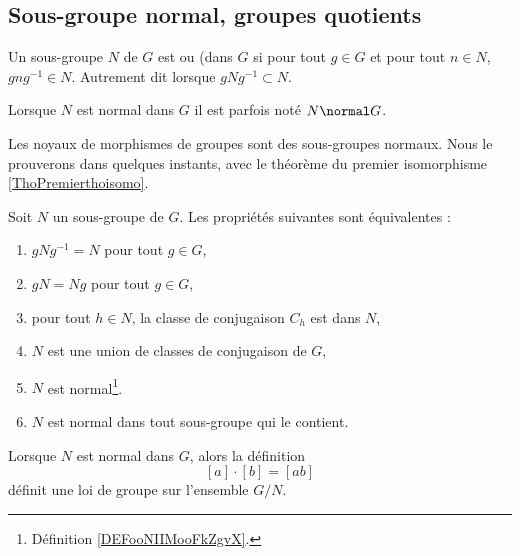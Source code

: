\subsection{Sous-groupe normal, groupes quotients}

\begin{definition}\label{DEFooNIIMooFkZgvX}
    Un sous-groupe \( N\) de \( G\) est  ou  (dans \( G \) si pour tout \( g\in G\) et pour tout \( n\in N\), \( gng^{-1}\in N\). Autrement dit lorsque \( gNg^{-1}\subset N\).

    Lorsque \( N\) est normal dans \( G\) il est parfois noté \( N\normal G\).
\end{definition}

\begin{example}
  Les noyaux de morphismes de groupes sont des sous-groupes normaux. Nous le prouverons dans quelques instants, avec le théorème du premier isomorphisme \ref{ThoPremierthoisomo}.
\end{example}

\begin{proposition}\label{propGroupeNormal}
    Soit \( N\) un sous-groupe de \( G\). Les propriétés suivantes sont équivalentes :
    \begin{enumerate}
        \item
            \( gNg^{-1}= N\) pour tout \( g\in G\),
        \item
            \( gN=Ng\) pour tout \( g\in G\),
        \item
            pour tout \( h \in N \), la classe de conjugaison \( C_h \) est dans \( N \),
        \item
            \( N\) est une union de classes de conjugaison de \( G\),
        \item
            \( N\) est normal\footnote{Définition \ref{DEFooNIIMooFkZgvX}.}.
        \item
            \( N \) est normal dans tout sous-groupe qui le contient.
    \end{enumerate}
\end{proposition}

\begin{lemma}       \label{LEMooFNVRooRCkjLc}
    Lorsque \( N\) est normal dans \( G\), alors la définition
    \begin{equation}        \label{EQooEUESooSeUWHK}
        [a]\cdot[b]=[ab]
    \end{equation}
    définit une loi de groupe sur l'ensemble \( G/N\).
\end{lemma}

